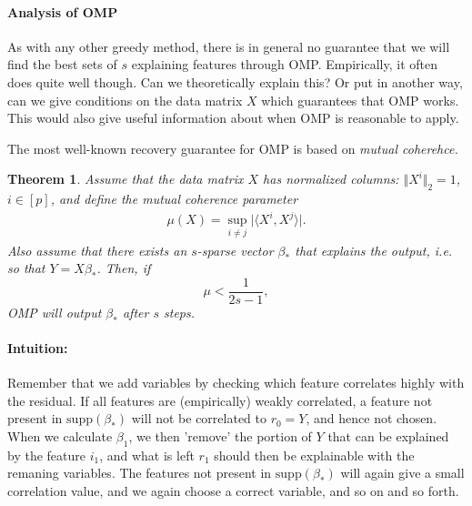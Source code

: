 \documentclass{article}
\newcommand{\sprod}[1]{\langle #1 \rangle}
\newtheorem{theorem}{Theorem}
\newcommand{\abs}[1]{\vert #1 \vert}
\newcommand{\norm}[1]{\Vert #1 \Vert}
\begin{document}
\paragraph{Analysis of OMP}
As with any other greedy method, there is in general no guarantee that we will find the best sets of $s$ explaining features through OMP. Empirically, it often does quite well though. Can we theoretically explain this? Or put in another way, can we give conditions on the data matrix $X$ which guarantees that OMP works. This would also give useful information about when OMP is reasonable to apply.

The most well-known recovery guarantee for OMP is based on \emph{mutual coherehce.}
\begin{theorem} \label{th:OMP}
    Assume that the data matrix $X$ has normalized columns: $\norm{X^i}_2=1$, $i\in [p]$, and define the \emph{mutual coherence} parameter
    \begin{align*}
        \mu(X) = \sup_{i \neq j } \abs{\sprod{X^i,X^j}}.
    \end{align*}
    Also assume that there exists an $s$-sparse vector $\beta_*$ that explains the output, i.e. so that $Y=X\beta_*$. Then, if $$\mu < \frac{1}{2s-1},$$ OMP will output $\beta_*$ after $s$ steps. 
\end{theorem}
\paragraph{Intuition:} Remember that we add variables by checking which feature correlates highly with the residual. If all features are (empirically) weakly correlated, a feature not present in $\mathrm{supp}(\beta_*)$ will not be correlated to $r_0=Y$, and hence not chosen. When we calculate $\beta_1$, we then 'remove' the portion of $Y$ that can be explained by the feature $i_1$, and what is left $r_1$ should then be explainable with the remaning variables. The features not present in $\mathrm{supp}(\beta_*)$ will again give a small correlation value, and we again choose a correct variable, and so on and so forth.
\end{document}
